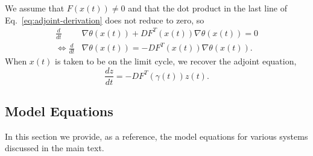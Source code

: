 \documentclass[12pt]{article}
\begin{document}
We assume that $F(x(t)) \neq 0$ and that the dot product in the last line of Eq.~\eqref{eq:adjoint-derivation} does not reduce to zero, so 
\begin{equation}
 \begin{split}
  \frac{d}{dt}& \nabla \theta(x(t)) + DF^T(x(t)) \nabla\theta(x(t)) = 0\\
  \Leftrightarrow \frac{d}{dt}& \nabla \theta(x(t)) = -DF^T(x(t)) \nabla\theta(x(t)).
 \end{split}
\end{equation}
When $x(t)$ is taken to be on the limit cycle, we recover the adjoint equation,
\begin{equation}
 \frac{dz}{dt} = -DF^T(\gamma(t)) z(t).
\end{equation}



\subsection{Model Equations}
In this section we provide, as a reference, the model equations for various systems discussed in the main text.  
\end{document}
